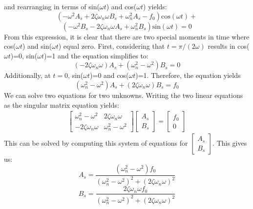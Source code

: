 \documentclass[12pt,letter]{article}
\begin{document}
	and rearranging in terms of sin($\omega t$) and cos($\omega t$) yields: 
	\begin{equation}
		(-\omega^2 A_s + 2 \zeta \omega_n \omega B_s + \omega_n^2 A_s -f_0) \text{cos}(\omega t) + 
	\end{equation}
	\begin{equation*}
		(-\omega^2 B_s - 2 \zeta \omega_n \omega A_s + \omega_n^2 B_s)\text{sin}(\omega t) =0
	\end{equation*}	
	From this expression, it is clear that there are two special moments in time where cos($\omega t$) and sin($\omega t$) equal zero. First, considering that $t=\pi/(2\omega)$ results in cos($\omega t$)=0, sin($\omega t$)=1 and the equation simplifies to:
	\begin{equation}
		(-2\zeta \omega_n \omega)A_s + (\omega_n^2 - \omega^2)B_s = 0
	\end{equation}	
	Additionally, at $t=0$, sin($\omega t$)=0 and cos($\omega t$)=1. Therefore, the equation yields		
	\begin{equation}
		(\omega_n^2 - \omega^2)A_s + (2\zeta \omega_n \omega)B_s = f_0
	\end{equation}				
	We can solve two equations for two unknowns. Writing the two linear equations as the singular matrix equation yields:
	\begin{gather}
\begin{bmatrix}
\omega_n^2 - \omega^2 & 2\zeta \omega_n \omega \\
- 2\zeta \omega_n \omega &  \omega_n^2 - \omega^2
\end{bmatrix}
\begin{bmatrix}
A_s \\
B_s
\end{bmatrix}
= \begin{bmatrix} f_0 \\ 0
\end{bmatrix}
	\end{gather}
	This can be solved by computing this system of equations for $\begin{bmatrix}
		A_s \\
		B_s
	\end{bmatrix}$. This gives us:
	\begin{equation}
		A_s = \frac{(\omega_n^2 - \omega^2)f_0}{(\omega_n^2 - \omega^2)^2 +  (2\zeta \omega_n \omega)^2}
	\end{equation}	
	\begin{equation}
		B_s = \frac{2\zeta \omega_n \omega f_0}{(\omega_n^2 - \omega^2)^2 +  (2\zeta \omega_n \omega)^2}
	\end{equation}	
\end{document}
